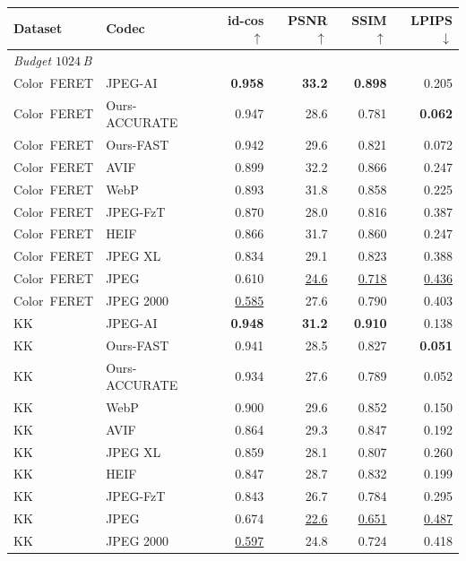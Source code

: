 \begin{tabular}{llrrrr}
\toprule
Dataset & Codec & id-cos$\uparrow$ & PSNR$\uparrow$ & SSIM$\uparrow$ & LPIPS$\downarrow$ \\
\midrule
\multicolumn{6}{l}{\emph{Budget $1024$\,B}}\\
Color~FERET & JPEG-AI & \cellcolor{green!25}\textbf{0.958} & \cellcolor{green!25}\textbf{33.2} & \cellcolor{green!25}\textbf{0.898} & 0.205 \\
Color~FERET & Ours-ACCURATE & 0.947 & 28.6 & 0.781 & \cellcolor{green!25}\textbf{0.062} \\
Color~FERET & Ours-FAST & 0.942 & 29.6 & 0.821 & 0.072 \\
Color~FERET & AVIF & 0.899 & 32.2 & 0.866 & 0.247 \\
Color~FERET & WebP & 0.893 & 31.8 & 0.858 & 0.225 \\
Color~FERET & JPEG-FzT & 0.870 & 28.0 & 0.816 & 0.387 \\
Color~FERET & HEIF & 0.866 & 31.7 & 0.860 & 0.247 \\
Color~FERET & JPEG XL & 0.834 & 29.1 & 0.823 & 0.388 \\
Color~FERET & JPEG & 0.610 & \cellcolor{red!22}\underline{24.6} & \cellcolor{red!22}\underline{0.718} & \cellcolor{red!22}\underline{0.436} \\
Color~FERET & JPEG 2000 & \cellcolor{red!22}\underline{0.585} & 27.6 & 0.790 & 0.403 \\
KK & JPEG-AI & \cellcolor{green!25}\textbf{0.948} & \cellcolor{green!25}\textbf{31.2} & \cellcolor{green!25}\textbf{0.910} & 0.138 \\
KK & Ours-FAST & 0.941 & 28.5 & 0.827 & \cellcolor{green!25}\textbf{0.051} \\
KK & Ours-ACCURATE & 0.934 & 27.6 & 0.789 & 0.052 \\
KK & WebP & 0.900 & 29.6 & 0.852 & 0.150 \\
KK & AVIF & 0.864 & 29.3 & 0.847 & 0.192 \\
KK & JPEG XL & 0.859 & 28.1 & 0.807 & 0.260 \\
KK & HEIF & 0.847 & 28.7 & 0.832 & 0.199 \\
KK & JPEG-FzT & 0.843 & 26.7 & 0.784 & 0.295 \\
KK & JPEG & 0.674 & \cellcolor{red!22}\underline{22.6} & \cellcolor{red!22}\underline{0.651} & \cellcolor{red!22}\underline{0.487} \\
KK & JPEG 2000 & \cellcolor{red!22}\underline{0.597} & 24.8 & 0.724 & 0.418 \\

\end{tabular}
